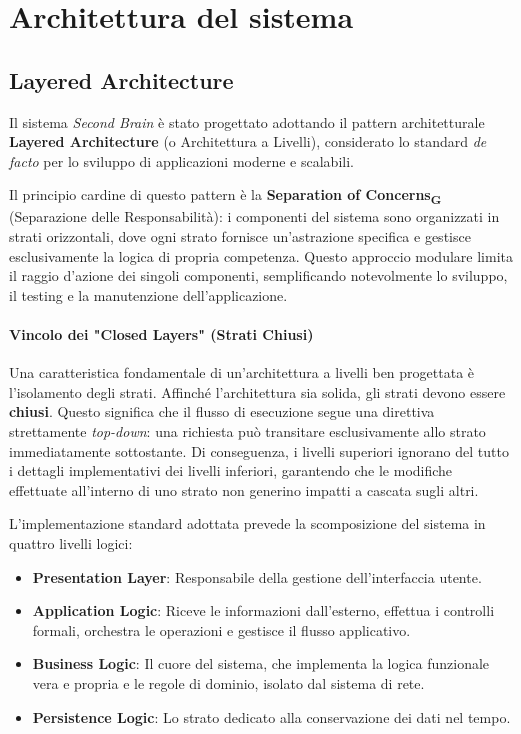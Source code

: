 \documentclass[11pt,a4paper]{article}
\newcommand{\gls}[1]{#1\textsubscript{G}}
\begin{document}
\newpage

\section{Architettura del sistema}
\subsection{Layered Architecture}
Il sistema \textit{Second Brain} è stato progettato adottando il pattern architetturale \textbf{Layered Architecture} (o Architettura a Livelli), considerato lo standard \textit{de facto} per lo sviluppo di applicazioni moderne e scalabili.

Il principio cardine di questo pattern è la \textbf{\gls{Separation of Concerns}} (Separazione delle Responsabilità): i componenti del sistema sono organizzati in strati orizzontali, dove ogni strato fornisce un'astrazione specifica e gestisce esclusivamente la logica di propria competenza. Questo approccio modulare limita il raggio d'azione dei singoli componenti, semplificando notevolmente lo sviluppo, il testing e la manutenzione dell'applicazione.

\paragraph{Vincolo dei "Closed Layers" (Strati Chiusi)}
Una caratteristica fondamentale di un'architettura a livelli ben progettata è l'isolamento degli strati. Affinché l'architettura sia solida, gli strati devono essere \textbf{chiusi}. Questo significa che il flusso di esecuzione segue una direttiva strettamente \textit{top-down}: una richiesta può transitare esclusivamente allo strato immediatamente sottostante. Di conseguenza, i livelli superiori ignorano del tutto i dettagli implementativi dei livelli inferiori, garantendo che le modifiche effettuate all'interno di uno strato non generino impatti a cascata sugli altri.

L'implementazione standard adottata prevede la scomposizione del sistema in quattro livelli logici:
\begin{itemize}
    \item \textbf{Presentation Layer}: Responsabile della gestione dell'interfaccia utente.
    \item \textbf{Application Logic}: Riceve le informazioni dall'esterno, effettua i controlli formali, orchestra le operazioni e gestisce il flusso applicativo.
    \item \textbf{Business Logic}: Il cuore del sistema, che implementa la logica funzionale vera e propria e le regole di dominio, isolato dal sistema di rete.
    \item \textbf{Persistence Logic}: Lo strato dedicato alla conservazione dei dati nel tempo.
\end{itemize}    
\end{document}
